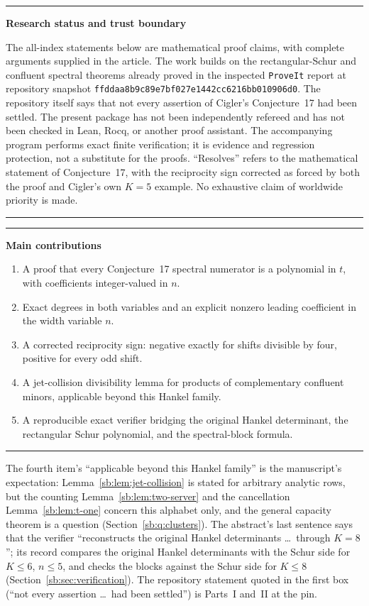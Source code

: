 \documentclass[11pt]{article}
\theoremstyle{definition}
\theoremstyle{remark}
\newcommand{\pinIV}{ffddaa8b9c89e7bf027e1442cc6216bb010906d0}
\theoremstyle{definition}
\theoremstyle{plain}
\newenvironment{statusbox}[1]{%
  \par\smallskip\noindent\begin{center}\begin{minipage}{0.94\textwidth}%
  \hrule\vspace{0.55em}\noindent\textbf{#1}\par\smallskip
}{%
  \vspace{0.55em}\hrule\end{minipage}\end{center}\smallskip
}
\numberwithin{equation}{section}
\begin{document}
\begin{statusbox}{Research status and trust boundary}
The all-index statements below are mathematical proof claims, with complete
arguments supplied in the article.  The work builds on the rectangular-Schur
and confluent spectral theorems already proved in the inspected
\texttt{ProveIt} report at repository snapshot \texttt{\pinIV}.  The repository
itself says that not every assertion of Cigler's Conjecture~17 had been
settled.  The present package has not been independently refereed and has not
been checked in Lean, Rocq, or another proof assistant.  The accompanying
program performs exact finite verification; it is evidence and regression
protection, not a substitute for the proofs.  ``Resolves'' refers to the
mathematical statement of Conjecture~17, with the reciprocity sign corrected as
forced by both the proof and Cigler's own $K=5$ example.  No exhaustive claim
of worldwide priority is made.
\end{statusbox}

\begin{statusbox}{Main contributions}
\begin{enumerate}
\item A proof that every Conjecture~17 spectral numerator is a polynomial in
      $t$, with coefficients integer-valued in $n$.
\item Exact degrees in both variables and an explicit nonzero leading
      coefficient in the width variable $n$.
\item A corrected reciprocity sign: negative exactly for shifts divisible by
      four, positive for every odd shift.
\item A jet-collision divisibility lemma for products of complementary
      confluent minors, applicable beyond this Hankel family.
\item A reproducible exact verifier bridging the original Hankel determinant,
      the rectangular Schur polynomial, and the spectral-block formula.
\end{enumerate}
\end{statusbox}

\noindent The fourth item's ``applicable beyond this Hankel family'' is the
manuscript's expectation: Lemma~\ref{sb:lem:jet-collision} is stated for
arbitrary analytic rows, but the counting Lemma~\ref{sb:lem:two-server} and
the cancellation Lemma~\ref{sb:lem:t-one} concern this alphabet only, and
the general capacity theorem is a question
(Section~\ref{sb:q:clusters}). The abstract's last sentence says that the
verifier ``reconstructs the original Hankel determinants \dots\ through
$K=8$''; its record compares the original Hankel determinants with the
Schur side for $K\le6$, $n\le5$, and checks the blocks against the Schur
side for $K\le8$ (Section~\ref{sb:sec:verification}). The repository statement
quoted in the first box (``not every assertion \dots\ had been settled'') is
Parts~I and~II at the pin.
\end{document}
